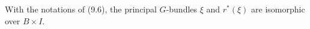 With the notations of (9.6), the principal $G$-bundles $\xi$ and $r^*(\xi)$ are isomorphic over $B \times I$.
